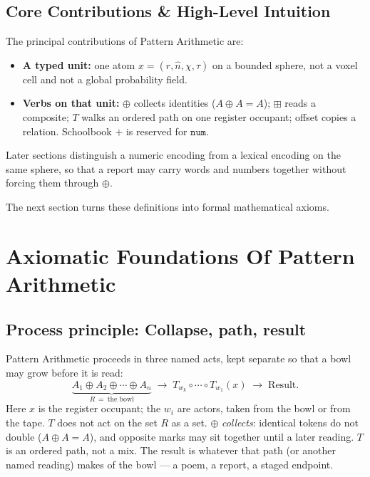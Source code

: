 \documentclass[12pt, a4paper]{article}
\begin{document}
\subsection{Core Contributions \& High-Level Intuition}
The principal contributions of Pattern Arithmetic are:
\begin{itemize}
    \item \textbf{A typed unit:} one atom $x=(r,\hat n,\chi,\tau)$ on a bounded sphere, not a voxel cell and not a global probability field.
    \item \textbf{Verbs on that unit:} $\oplus$ collects identities ($A\oplus A=A$); $\boxplus$ reads a composite; $T$ walks an ordered path on one register occupant; offset copies a relation. Schoolbook $+$ is reserved for $\mathtt{num}$.
\end{itemize}

Later sections distinguish a numeric encoding from a lexical encoding on the same sphere, so that a report may carry words and numbers together without forcing them through $\oplus$.

The next section turns these definitions into formal mathematical axioms.


\section{Axiomatic Foundations Of Pattern Arithmetic}

\subsection{Process principle: Collapse, path, result}
\label{subsec:process_principle}
Pattern Arithmetic proceeds in three named acts, kept separate so that a bowl may grow before it is read:
\begin{equation}
    \underbrace{A_1 \oplus A_2 \oplus \cdots \oplus A_n}_{R\ =\ \text{the bowl}}
    \;\longrightarrow\;
    T_{w_k}\circ \cdots \circ T_{w_1}(x)
    \;\longrightarrow\;
    \text{Result}.
    \label{eq:pipeline}
\end{equation}
Here $x$ is the register occupant; the $w_i$ are actors, taken from
the bowl or from the tape. $T$ does not act on the set $R$ as a set.
$\oplus$ \emph{collects}: identical tokens do not double ($A \oplus A = A$), and opposite marks may sit together until a later reading. $T$ is an ordered path, not a mix. The result is whatever that path (or another named reading) makes of the bowl --- a poem, a report, a staged endpoint.
\end{document}
